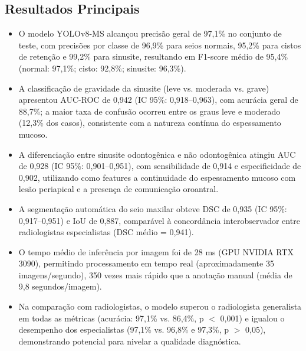 \subsection{Resultados Principais}
\begin{itemize}
  \item O modelo YOLOv8-MS alcançou precisão geral de 97,1\% no
        conjunto de teste, com precisões por classe de 96,9\% para
        seios normais, 95,2\% para cistos de retenção e 99,2\% para
        sinusite, resultando em F1-score médio de 95,4\% (normal:
        97,1\%; cisto: 92,8\%; sinusite: 96,3\%).
  \item A classificação de gravidade da sinusite (leve vs. moderada
        vs. grave) apresentou AUC-ROC de 0,942 (IC 95\%: 0,918--0,963),
        com acurácia geral de 88,7\%; a maior taxa de confusão ocorreu
        entre os graus leve e moderado (12,3\% dos casos),
        consistente com a natureza contínua do espessamento mucoso.
  \item A diferenciação entre sinusite odontogênica e não odontogênica
        atingiu AUC de 0,928 (IC 95\%: 0,901--0,951), com
        sensibilidade de 0,914 e especificidade de 0,902, utilizando
        como features a continuidade do espessamento mucoso com
        lesão periapical e a presença de comunicação oroantral.
  \item A segmentação automática do seio maxilar obteve DSC de 0,935
        (IC 95\%: 0,917--0,951) e IoU de 0,887, comparável à
        concordância interobservador entre radiologistas especialistas
        (DSC médio = 0,941).
  \item O tempo médio de inferência por imagem foi de 28 ms (GPU
        NVIDIA RTX 3090), permitindo processamento em tempo real
        (aproximadamente 35 imagens/segundo), 350 vezes mais rápido
        que a anotação manual (média de 9,8 segundos/imagem).
  \item Na comparação com radiologistas, o modelo superou o
        radiologista generalista em todas as métricas (acurácia:
        97,1\% vs. 86,4\%, p $<$ 0,001) e igualou o desempenho dos
        especialistas (97,1\% vs. 96,8\% e 97,3\%, p $>$ 0,05),
        demonstrando potencial para nivelar a qualidade diagnóstica.
\end{itemize}

